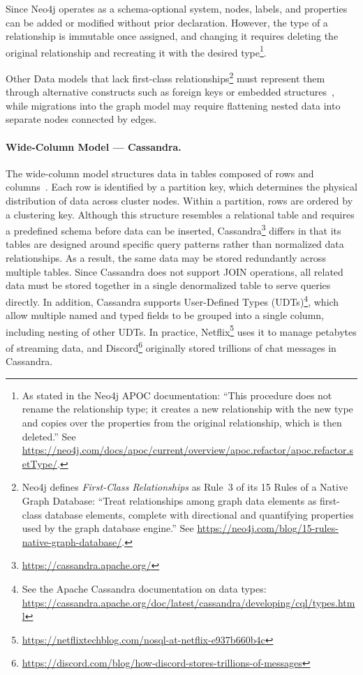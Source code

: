Since Neo4j operates as a schema-optional system, nodes, labels, and
properties can be added or modified without prior declaration. However, the type of a relationship is immutable once assigned, and
changing it requires deleting the original relationship and recreating
it with the desired
type\footnote{As stated in the Neo4j APOC documentation: ``This procedure does not rename the relationship type; it creates a new relationship with the new type and copies over the properties from the original relationship, which is then deleted.'' See \url{https://neo4j.com/docs/apoc/current/overview/apoc.refactor/apoc.refactor.setType/}.}.

Other Data models that lack first-class
relationships\footnote{Neo4j defines \emph{First-Class Relationships}
as Rule~3 of its 15 Rules of a Native Graph Database:
``Treat relationships among graph data elements as first-class database
elements, complete with directional and quantifying properties used by
the graph database engine.''
See \url{https://neo4j.com/blog/15-rules-native-graph-database/}.}
must represent them through alternative constructs such as foreign keys
or embedded structures~\cite{lu2019multi}, while migrations into the
graph model may require flattening nested data into separate nodes
connected by edges.

\paragraph{Wide-Column Model — Cassandra.}\quad

The wide-column model structures data in tables composed of rows and
columns~\cite{carpenter2022cassandra}. Each row is identified by a
partition key, which determines the physical distribution of data
across cluster nodes. Within a partition, rows are ordered by a
clustering key. Although this structure resembles a relational table
and requires a predefined schema before data can be inserted,
Cassandra\footnote{\url{https://cassandra.apache.org/}} differs in
that its tables are designed around specific query patterns rather
than normalized data relationships. As a result, the same data may be
stored redundantly across multiple tables. Since Cassandra does not
support JOIN operations, all related data must be stored together in a
single denormalized table to serve queries directly. In addition,
Cassandra supports User-Defined Types
(UDTs)\footnote{See the Apache Cassandra documentation on data types:
\url{https://cassandra.apache.org/doc/latest/cassandra/developing/cql/types.html}},
which allow multiple named and typed fields to be grouped into a
single column, including nesting of other UDTs.
In practice, Netflix\footnote{\url{https://netflixtechblog.com/nosql-at-netflix-e937b660b4c}}
uses it to manage petabytes of streaming data, and
Discord\footnote{\url{https://discord.com/blog/how-discord-stores-trillions-of-messages}}
originally stored trillions of chat messages in Cassandra.

